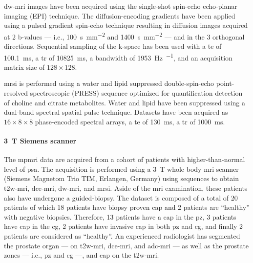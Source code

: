 \ac{dw}-\ac{mri} images have been acquired using the single-shot spin-echo echo-planar imaging (EPI) technique.
The diffusion-encoding gradients have been applied using a pulsed gradient spin-echo technique resulting in diffusion images acquired at 2 b-values --- i.e., \SI{100}{\second\per\milli\meter\squared} and \SI{1400}{\second\per\milli\meter\squared} --- and in the 3 orthogonal directions.
Sequential sampling of the k-space has been used with a \ac{te} of \SI{100.1}{\ms}, a \ac{tr} of \SI{10825}{\ms}, a bandwidth of \SI{1953}{\hertz\per\px}, and an acquisition matrix size of $128 \times 128$.

\ac{mrsi} is performed using a water and lipid suppressed double-spin-echo point-resolved spectroscopic (PRESS) sequence optimized for quantification detection of choline and citrate metabolites.
Water and lipid have been suppressed using a dual-band spectral spatial pulse technique.
Datasets have been acquired as $16 \times 8 \times 8$ phase-encoded spectral arrays, a \ac{te} of \SI{130}{\ms}, a \ac{tr} of \SI{1000}{\ms}.%

\paragraph{\SI{3}{\tesla} Siemens scanner}

The \ac{mpmri} data are acquired from a cohort of patients with higher-than-normal level of \ac{psa}.
The acquisition is performed using a \SI{3}{\tesla} whole body \ac{mri} scanner (Siemens Magnetom Trio TIM, Erlangen, Germany) using sequences to obtain \ac{t2w}-\ac{mri}, \ac{dce}-\ac{mri}, \ac{dw}-\ac{mri}, and \ac{mrsi}.
Aside of the \ac{mri} examination, these patients also have undergone a guided-biopsy.
The dataset is composed of a total of 20 patients of which 18 patients have biopsy proven \ac{cap} and 2 patients are ``healthy'' with negative biopsies.
Therefore, 13 patients have a \ac{cap} in the \ac{pz}, 3 patients have \ac{cap} in the \ac{cg}, 2 patients have invasive \ac{cap} in both \ac{pz} and \ac{cg}, and finally 2 patients are considered as ``healthy''.
An experienced radiologist has segmented the prostate organ --- on \ac{t2w}-\ac{mri}, \ac{dce}-\ac{mri}, and \ac{adc}-\ac{mri} --- as well as the prostate zones --- i.e., \ac{pz} and \ac{cg} ---, and \ac{cap} on the \ac{t2w}-\ac{mri}.

